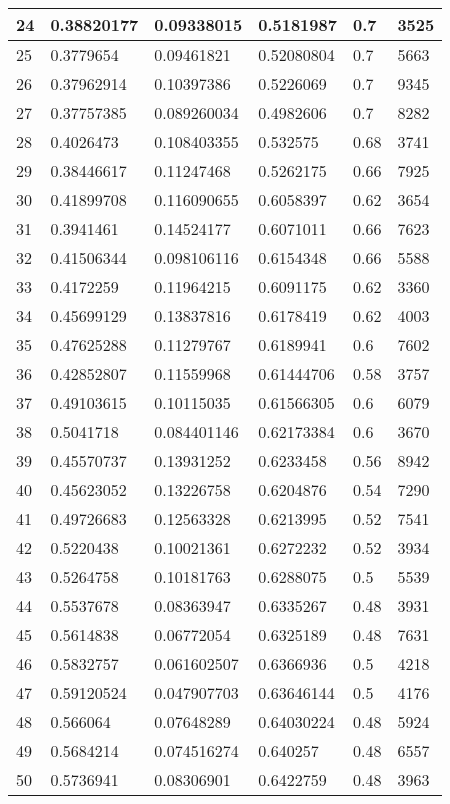 \begin{longtable}{|l|l|l|l|l|l|}
24 & 0.38820177 & 0.09338015 & 0.5181987 & 0.7 & 3525 \\ \hline 
25 & 0.3779654 & 0.09461821 & 0.52080804 & 0.7 & 5663 \\ \hline 
26 & 0.37962914 & 0.10397386 & 0.5226069 & 0.7 & 9345 \\ \hline 
27 & 0.37757385 & 0.089260034 & 0.4982606 & 0.7 & 8282 \\ \hline 
28 & 0.4026473 & 0.108403355 & 0.532575 & 0.68 & 3741 \\ \hline 
29 & 0.38446617 & 0.11247468 & 0.5262175 & 0.66 & 7925 \\ \hline 
30 & 0.41899708 & 0.116090655 & 0.6058397 & 0.62 & 3654 \\ \hline 
31 & 0.3941461 & 0.14524177 & 0.6071011 & 0.66 & 7623 \\ \hline 
32 & 0.41506344 & 0.098106116 & 0.6154348 & 0.66 & 5588 \\ \hline 
33 & 0.4172259 & 0.11964215 & 0.6091175 & 0.62 & 3360 \\ \hline 
34 & 0.45699129 & 0.13837816 & 0.6178419 & 0.62 & 4003 \\ \hline 
35 & 0.47625288 & 0.11279767 & 0.6189941 & 0.6 & 7602 \\ \hline 
36 & 0.42852807 & 0.11559968 & 0.61444706 & 0.58 & 3757 \\ \hline 
37 & 0.49103615 & 0.10115035 & 0.61566305 & 0.6 & 6079 \\ \hline 
38 & 0.5041718 & 0.084401146 & 0.62173384 & 0.6 & 3670 \\ \hline 
39 & 0.45570737 & 0.13931252 & 0.6233458 & 0.56 & 8942 \\ \hline 
40 & 0.45623052 & 0.13226758 & 0.6204876 & 0.54 & 7290 \\ \hline 
41 & 0.49726683 & 0.12563328 & 0.6213995 & 0.52 & 7541 \\ \hline 
42 & 0.5220438 & 0.10021361 & 0.6272232 & 0.52 & 3934 \\ \hline 
43 & 0.5264758 & 0.10181763 & 0.6288075 & 0.5 & 5539 \\ \hline 
44 & 0.5537678 & 0.08363947 & 0.6335267 & 0.48 & 3931 \\ \hline 
45 & 0.5614838 & 0.06772054 & 0.6325189 & 0.48 & 7631 \\ \hline 
46 & 0.5832757 & 0.061602507 & 0.6366936 & 0.5 & 4218 \\ \hline 
47 & 0.59120524 & 0.047907703 & 0.63646144 & 0.5 & 4176 \\ \hline 
48 & 0.566064 & 0.07648289 & 0.64030224 & 0.48 & 5924 \\ \hline 
49 & 0.5684214 & 0.074516274 & 0.640257 & 0.48 & 6557 \\ \hline 
50 & 0.5736941 & 0.08306901 & 0.6422759 & 0.48 & 3963 \\ \hline 
\end{longtable}